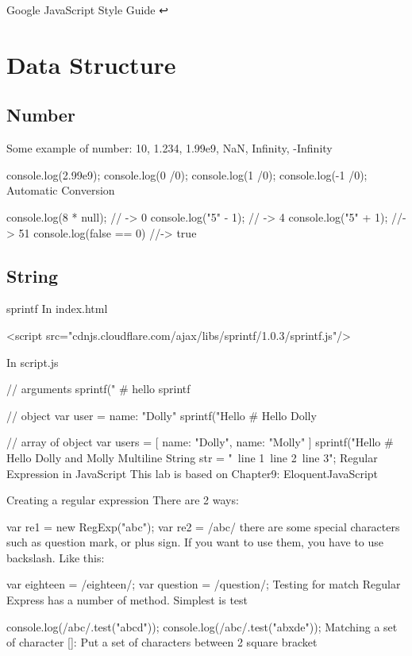 Google JavaScript Style Guide ↩

\section{Data Structure}

\subsection{Number}

Some example of number: 10, 1.234, 1.99e9, NaN, Infinity, -Infinity

console.log(2.99e9);
console.log(0 /0);
console.log(1 /0);
console.log(-1 /0);
Automatic Conversion

console.log(8 * null); // -> 0
console.log("5" - 1); // -> 4
console.log("5" + 1); //-> 51
console.log(false == 0) //-> true

\subsection{String}

sprintf
In index.html

<script src="cdnjs.cloudflare.com/ajax/libs/sprintf/1.0.3/sprintf.js"/>

In script.js

// arguments
sprintf("%
# hello sprintf

// object
var user = {
    name: "Dolly"
}
sprintf("Hello %
# Hello Dolly

// array of object
var users = [
    {name: "Dolly"},
    {name: "Molly"}
]
sprintf("Hello %
# Hello Dolly and Molly
Multiline String
str = "\
line 1\
line 2\
line 3";
Regular Expression in JavaScript
This lab is based on Chapter9: EloquentJavaScript

Creating a regular expression
There are 2 ways:

var re1 = new RegExp("abc");
var re2 = /abc/
there are some special characters such as question mark, or plus sign. If you want to use them, you have to use backslash. Like this:

var eighteen = /eighteen\+/;
var question = /question\?/;
Testing for match
Regular Express has a number of method. Simplest is test

console.log(/abc/.test("abcd"));
console.log(/abc/.test("abxde"));
Matching a set of character []: Put a set of characters between 2 square bracket

